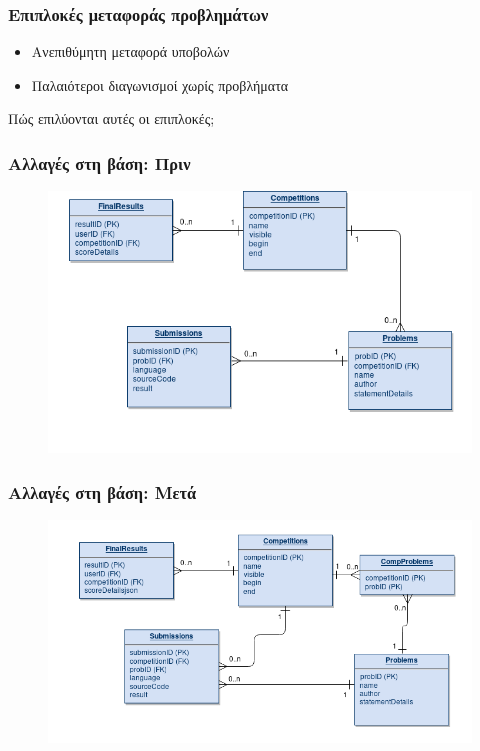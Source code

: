 \documentclass{beamer}
\begin{document}
\begin{frame}
  \frametitle{Επιπλοκές μεταφοράς προβλημάτων}

  \begin{itemize}
      \item Ανεπιθύμητη μεταφορά υποβολών
      \item Παλαιότεροι διαγωνισμοί χωρίς προβλήματα
  \end{itemize}%

  \bigskip

  Πώς επιλύονται αυτές οι επιπλοκές;
\end{frame}

\begin{frame}
  \frametitle{Αλλαγές στη βάση: Πριν}

  \begin{figure}

    \includegraphics[scale=0.4,trim=4 4 4 4,clip]{../Figures/sepbefore.png}
  \end{figure}
\end{frame}

\begin{frame}
  \frametitle{Αλλαγές στη βάση: Μετά}

  \begin{figure}
    \includegraphics[scale=0.4,trim=4 4 4 4,clip]{../Figures/sepafter.png}
  \end{figure}
\end{frame}
\end{document}
